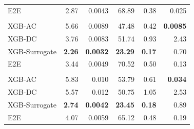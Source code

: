 \begin{longtable}{lrrrrr}
E2E & 2.87 & 0.0043 & 68.89 & 0.38 & 0.025 \\
\addlinespace[2pt]
\multicolumn{6}{@{}l}{\quad Horizon $H=6$} \\[2pt]
XGB-AC & 5.66 & 0.0089 & 47.48 & 0.42 & \textbf{0.0085} \\
XGB-DC & 3.76 & 0.0083 & 51.74 & 0.93 & 2.43 \\
XGB-Surrogate & \textbf{2.26} & \textbf{0.0032} & \textbf{23.29} & \textbf{0.17} & 0.70 \\
E2E & 3.44 & 0.0049 & 70.52 & 0.50 & 0.13 \\
\addlinespace[2pt]
\multicolumn{6}{@{}l}{\quad Horizon $H=24$} \\[2pt]
XGB-AC & 5.83 & 0.010 & 53.79 & 0.61 & \textbf{0.034} \\
XGB-DC & 5.57 & 0.012 & 50.75 & 1.05 & 2.53 \\
XGB-Surrogate & \textbf{2.74} & \textbf{0.0042} & \textbf{23.45} & \textbf{0.18} & 0.89 \\
E2E & 4.07 & 0.0059 & 65.12 & 0.48 & 0.19 \\
\end{longtable}
\endgroup
